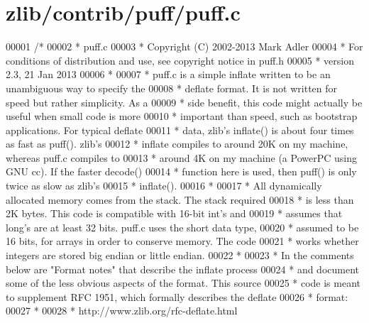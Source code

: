 \hypertarget{zlib_2contrib_2puff_2puff_8c_source}{}\section{zlib/contrib/puff/puff.c}
\label{zlib_2contrib_2puff_2puff_8c_source}

\begin{DoxyCode}
00001 \textcolor{comment}{/*}
00002 \textcolor{comment}{ * puff.c}
00003 \textcolor{comment}{ * Copyright (C) 2002-2013 Mark Adler}
00004 \textcolor{comment}{ * For conditions of distribution and use, see copyright notice in puff.h}
00005 \textcolor{comment}{ * version 2.3, 21 Jan 2013}
00006 \textcolor{comment}{ *}
00007 \textcolor{comment}{ * puff.c is a simple inflate written to be an unambiguous way to specify the}
00008 \textcolor{comment}{ * deflate format.  It is not written for speed but rather simplicity.  As a}
00009 \textcolor{comment}{ * side benefit, this code might actually be useful when small code is more}
00010 \textcolor{comment}{ * important than speed, such as bootstrap applications.  For typical deflate}
00011 \textcolor{comment}{ * data, zlib's inflate() is about four times as fast as puff().  zlib's}
00012 \textcolor{comment}{ * inflate compiles to around 20K on my machine, whereas puff.c compiles to}
00013 \textcolor{comment}{ * around 4K on my machine (a PowerPC using GNU cc).  If the faster decode()}
00014 \textcolor{comment}{ * function here is used, then puff() is only twice as slow as zlib's}
00015 \textcolor{comment}{ * inflate().}
00016 \textcolor{comment}{ *}
00017 \textcolor{comment}{ * All dynamically allocated memory comes from the stack.  The stack required}
00018 \textcolor{comment}{ * is less than 2K bytes.  This code is compatible with 16-bit int's and}
00019 \textcolor{comment}{ * assumes that long's are at least 32 bits.  puff.c uses the short data type,}
00020 \textcolor{comment}{ * assumed to be 16 bits, for arrays in order to conserve memory.  The code}
00021 \textcolor{comment}{ * works whether integers are stored big endian or little endian.}
00022 \textcolor{comment}{ *}
00023 \textcolor{comment}{ * In the comments below are "Format notes" that describe the inflate process}
00024 \textcolor{comment}{ * and document some of the less obvious aspects of the format.  This source}
00025 \textcolor{comment}{ * code is meant to supplement RFC 1951, which formally describes the deflate}
00026 \textcolor{comment}{ * format:}
00027 \textcolor{comment}{ *}
00028 \textcolor{comment}{ *    http://www.zlib.org/rfc-deflate.html}

\end{DoxyCode}
